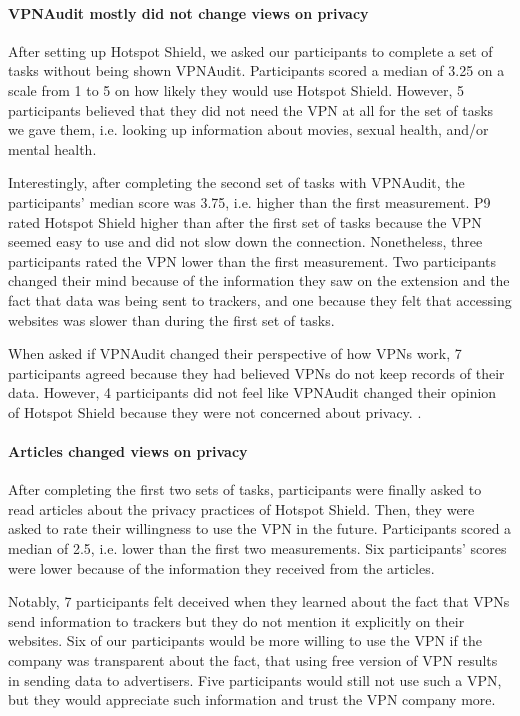 \paragraph{VPNAudit mostly did not change views on privacy}

After setting up Hotspot Shield, we asked our participants to complete a set of tasks without being shown VPNAudit. Participants scored a median of 3.25 on a scale
from 1 to 5 on how likely they would use Hotspot Shield. However, 5 participants believed that they did not need the VPN at all for the set of tasks we gave them, i.e. looking up information about movies, sexual health, and/or mental health. 

Interestingly, after completing the second set of tasks with VPNAudit, the participants' median score was 3.75, i.e. higher than the first measurement. P9 rated Hotspot Shield higher than after the first set of tasks because the VPN seemed easy to use and did not slow down the connection. Nonetheless, three participants rated the VPN lower than the
first measurement. Two participants changed their mind because of the information they saw on the extension and the fact that data was being sent to trackers, and one because
they felt that accessing websites was slower than during the first set of
tasks.

When asked if VPNAudit changed their perspective of how VPNs work, 7
participants agreed because they had believed VPNs do not keep records of their data.  However, 4 participants did not feel like VPNAudit changed their opinion of Hotspot Shield because they were not concerned about privacy. .

\paragraph{Articles changed views on privacy}

After completing the first two sets of tasks, participants were finally asked to read articles
about the privacy practices of Hotspot Shield. Then, they were asked to rate
their willingness to use the VPN in the future. Participants scored a median
of 2.5, i.e. lower than the first two measurements. Six participants' scores were
lower because of the information they received from the articles.

Notably, 7 participants felt deceived when they learned about the fact that
VPNs send information to trackers but they do not mention it explicitly on
their websites. Six of our participants would be more willing to use the VPN
if the company was transparent about the fact, that using free version of VPN
results in sending data to advertisers.  Five participants would still not use such a
VPN, but they would appreciate such information and trust the VPN company
more.

